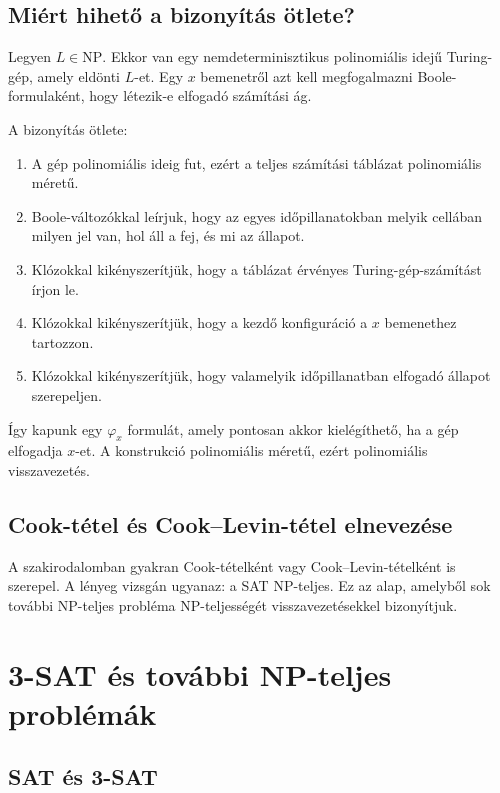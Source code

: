 \subsection{Miért hihető a bizonyítás ötlete?}

Legyen $L\in\mathrm{NP}$. Ekkor van egy nemdeterminisztikus polinomiális idejű Turing-gép, amely eldönti $L$-et. Egy $x$ bemenetről azt kell megfogalmazni Boole-formulaként, hogy létezik-e elfogadó számítási ág.

A bizonyítás ötlete:

\begin{enumerate}
  \item A gép polinomiális ideig fut, ezért a teljes számítási táblázat polinomiális méretű.
  \item Boole-változókkal leírjuk, hogy az egyes időpillanatokban melyik cellában milyen jel van, hol áll a fej, és mi az állapot.
  \item Klózokkal kikényszerítjük, hogy a táblázat érvényes Turing-gép-számítást írjon le.
  \item Klózokkal kikényszerítjük, hogy a kezdő konfiguráció a $x$ bemenethez tartozzon.
  \item Klózokkal kikényszerítjük, hogy valamelyik időpillanatban elfogadó állapot szerepeljen.
\end{enumerate}

Így kapunk egy $\varphi_x$ formulát, amely pontosan akkor kielégíthető, ha a gép elfogadja $x$-et. A konstrukció polinomiális méretű, ezért polinomiális visszavezetés.

\subsection{Cook-tétel és Cook--Levin-tétel elnevezése}

A szakirodalomban gyakran Cook-tételként vagy Cook--Levin-tételként is szerepel. A lényeg vizsgán ugyanaz: a SAT NP-teljes. Ez az alap, amelyből sok további NP-teljes probléma NP-teljességét visszavezetésekkel bizonyítjuk.

\section{3-SAT és további NP-teljes problémák}

\subsection{SAT és 3-SAT}

